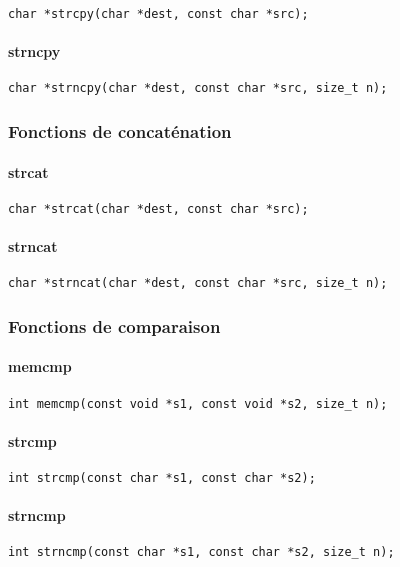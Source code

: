 \begin{Verbatim}
char *strcpy(char *dest, const char *src);
\end{Verbatim}

\paragraph{strncpy}

\begin{Verbatim}
char *strncpy(char *dest, const char *src, size_t n);
\end{Verbatim}

\subsubsection{Fonctions de concaténation}

\paragraph{strcat}
\begin{Verbatim}
char *strcat(char *dest, const char *src);
\end{Verbatim}
\paragraph{strncat}
\begin{Verbatim}
char *strncat(char *dest, const char *src, size_t n);
\end{Verbatim}

\subsubsection{Fonctions de comparaison}

\paragraph{memcmp}
\begin{Verbatim}
int memcmp(const void *s1, const void *s2, size_t n);
\end{Verbatim}
\paragraph{strcmp}
\begin{Verbatim}
int strcmp(const char *s1, const char *s2);
\end{Verbatim}
\paragraph{strncmp}
\begin{Verbatim}
int strncmp(const char *s1, const char *s2, size_t n);
\end{Verbatim}
